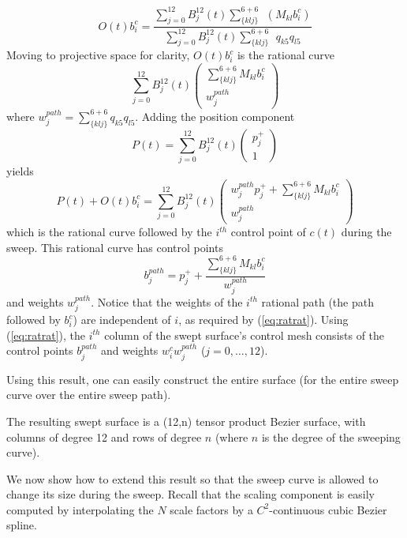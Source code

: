\[
	O(t)b_i^{c} = 
\frac{\sum_{j=0}^{12} B_j^{12}(t) \sum_{\{klj\}}^{6+6}
	\ \ (M_{kl} b_i^{c}) }
     {\sum_{j=0}^{12} B_j^{12}(t) \sum_{\{klj\}}^{6+6} 
	\ \ q_{k5}q_{l5}}
\]
Moving to projective space for clarity, 
$O(t)b_i^{c}$ is the rational curve
\[
	\sum_{j=0}^{12} B_j^{12}(t) 
	\left(	\begin{array}{c}
	\sum_{\{klj\}}^{6+6} M_{kl} b_i^{c} \\ w_j^{path}
	\end{array} \right)
\]
where $w_j^{path} = \sum_{\{klj\}}^{6+6} q_{k5} q_{l5}$.
Adding the position component 
\[
P(t) = 	\sum_{j=0}^{12} B_j^{12}(t) 
	\left(	\begin{array}{c}
	p_j^{+} \\ 1
	\end{array} \right)
\]
yields
\[
P(t) + O(t)b_i^{c} = 
	\sum_{j=0}^{12} B_j^{12}(t) 
	\left(	\begin{array}{c}
	w_j^{path} p_j^{+} + \sum_{\{klj\}}^{6+6} M_{kl} b_i^{c} \\ 
	w_j^{path}
	\end{array} \right)
\]
which is the rational curve followed by the $i^{th}$ control point
of $c(t)$ during the sweep.
This rational curve has control points 
\begin{equation}
\label{eq:tpcontrol}
b_{j}^{path} = p_j^{+} + \frac{\sum_{\{klj\}}^{6+6} M_{kl} b_i^{c}}{w_j^{path}}
\end{equation}
and weights $w_j^{path}$.
Notice that the weights of the $i^{th}$ rational path 
(the path followed by $b_i^c$) are 
independent of $i$, as required by (\ref{eq:ratrat}).
Using (\ref{eq:ratrat}), 
the $i^{th}$ column of the swept surface's control mesh consists
of the control points $b_{j}^{path}$
and weights $w_i^{c} w_j^{path}$ ($j=0,\ldots,12$).
\QED

Using this result, one can easily construct the entire surface
(for the entire sweep curve over the entire sweep path).

\begin{corollary}
The resulting swept surface is a (12,n) tensor product Bezier surface,
with columns of degree 12 and rows of degree $n$
(where $n$ is the degree of the sweeping curve).
\end{corollary}

We now show how to extend this result so that the sweep curve
is allowed to change its size during the sweep.
Recall that the scaling component is easily computed by interpolating the
$N$ scale factors by a $C^2$-continuous cubic Bezier spline.

